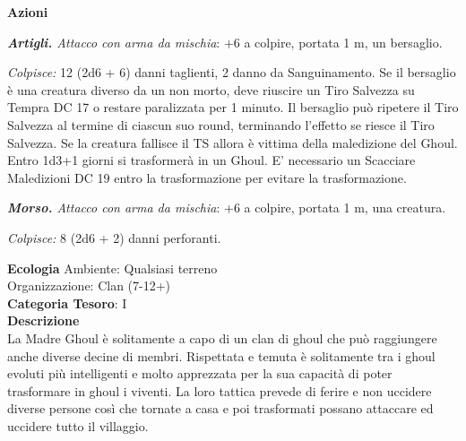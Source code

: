 \begin{multicols}{2}
{\textbf{Azioni}

\emph{\textbf{Artigli.} Attacco con arma da mischia}: +6 a colpire, portata 1 m, un bersaglio.

\emph{Colpisce:} 12 (2d6 + 6) danni taglienti, 2 danno da Sanguinamento. Se il bersaglio è una creatura diverso da un non morto, deve riuscire un Tiro Salvezza su Tempra DC 17 o restare paralizzata per 1 minuto. Il bersaglio può ripetere il Tiro Salvezza al termine di ciascun suo round, terminando l'effetto se riesce il Tiro Salvezza. Se la creatura fallisce il TS allora è vittima della maledizione del Ghoul. Entro 1d3+1 giorni si trasformerà in un Ghoul. E' necessario un Scacciare Maledizioni DC 19 entro la trasformazione per evitare la trasformazione.

\emph{\textbf{Morso.} Attacco con arma da mischia}: +6 a colpire, portata 1 m, una creatura.

\emph{Colpisce:} 8 (2d6 + 2) danni perforanti.

\textbf{Ecologia}
Ambiente: Qualsiasi terreno\\
Organizzazione: Clan (7-12+)\\
\textbf{Categoria Tesoro}: I\\
\textbf{Descrizione}\\
La Madre Ghoul è solitamente a capo di un clan di ghoul che può raggiungere anche diverse decine di membri. Rispettata e temuta è solitamente tra i ghoul evoluti più intelligenti e molto apprezzata per la sua capacità di poter trasformare in ghoul i viventi. La loro tattica prevede di ferire e non uccidere diverse persone così che tornate a casa e poi trasformati possano attaccare ed uccidere tutto il villaggio.


}
\end{multicols}
